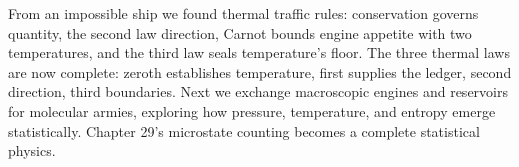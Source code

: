 From an impossible ship we found thermal traffic rules: conservation governs quantity, the second law direction, Carnot bounds engine appetite with two temperatures, and the third law seals temperature's floor. The three thermal laws are now complete: zeroth establishes temperature, first supplies the ledger, second direction, third boundaries. Next we exchange macroscopic engines and reservoirs for molecular armies, exploring how pressure, temperature, and entropy emerge statistically. Chapter 29's microstate counting becomes a complete statistical physics.
